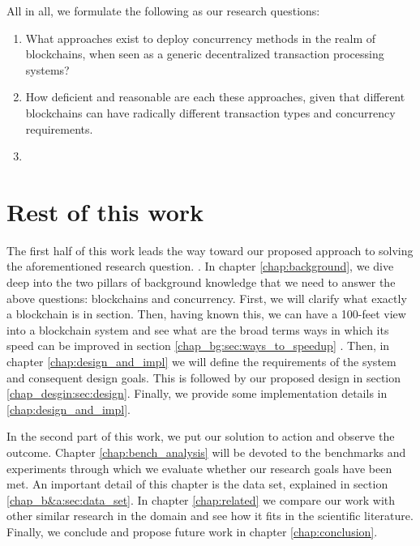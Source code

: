  All in all, we formulate the following as our research questions:

 \begin{enumerate}
     \item What approaches exist to deploy concurrency methods in the realm of blockchains, when
     seen as a generic decentralized transaction processing systems?
     \item How deficient and reasonable are each these approaches, given that different blockchains
	 can have radically different transaction types and concurrency requirements.
	 \item {}
 \end{enumerate}

\section{Rest of this work}

The first half of this work leads the way toward our proposed approach to solving the aforementioned
research question. . In
chapter \ref{chap:background}, we dive deep into the two pillars of background knowledge that we
need to answer the above questions: blockchains and concurrency. First, we will clarify what exactly
a blockchain is in section. Then, having known this, we can have a 100-feet view into a blockchain
system and see what are the broad terms ways in which its speed can be improved in section
\ref{chap_bg:sec:ways_to_speedup} . Then, in chapter \ref{chap:design_and_impl} we will define the
requirements of the system and consequent design goals. This is followed by our proposed design in
section \ref{chap_desgin:sec:design}. Finally, we provide some implementation details in
\ref{chap:design_and_impl}.

In the second part of this work, we put our solution to action and observe the outcome. Chapter
\ref{chap:bench_analysis} will be devoted to the benchmarks and experiments through which we
evaluate whether our research goals have been met. An important detail of this chapter is the data
set, explained in section \ref{chap_b&a:sec:data_set}. In chapter \ref{chap:related} we compare our
work with other similar research in the domain and see how it fits in the scientific literature.
Finally, we conclude and propose future work in chapter \ref{chap:conclusion}.

